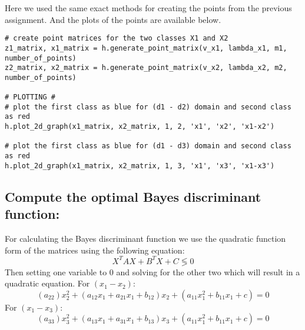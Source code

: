 \documentclass[11pt, oneside]{article}   	%
\begin{document}
Here we used the same exact methods for creating the points from the previous assignment.
And the plots of the points are available below.

\begin{lstlisting}[label={list:first},caption=Gaussian vector generation]
# create point matrices for the two classes X1 and X2
z1_matrix, x1_matrix = h.generate_point_matrix(v_x1, lambda_x1, m1, number_of_points)
z2_matrix, x2_matrix = h.generate_point_matrix(v_x2, lambda_x2, m2, number_of_points)

# PLOTTING #
# plot the first class as blue for (d1 - d2) domain and second class as red
h.plot_2d_graph(x1_matrix, x2_matrix, 1, 2, 'x1', 'x2', 'x1-x2')

# plot the first class as blue for (d1 - d3) domain and second class as red
h.plot_2d_graph(x1_matrix, x2_matrix, 1, 3, 'x1', 'x3', 'x1-x3')
\end{lstlisting}


\subsection{Compute the optimal Bayes discriminant function:}

For calculating the Bayes discriminant function we use the quadratic function form of the matrices using the following equation:
$$ X^TAX+B^TX+C \lessgtr 0 $$
Then setting one variable to 0 and solving for the other two which will result in a quadratic equation.
For $(x_1-x_2)$:
$$(a_{22})x_2^2+(a_{12}x_{1}+a_{21}x_{1}+b_{12})x_2+(a_{11}x_1^2+b_{11}x_1+c)=0$$
For $(x_1-x_3)$:
$$(a_{33})x_3^2+(a_{13}x_{1}+a_{31}x_{1}+b_{13})x_3+(a_{11}x_1^2+b_{11}x_1+c)=0$$
\end{document}
